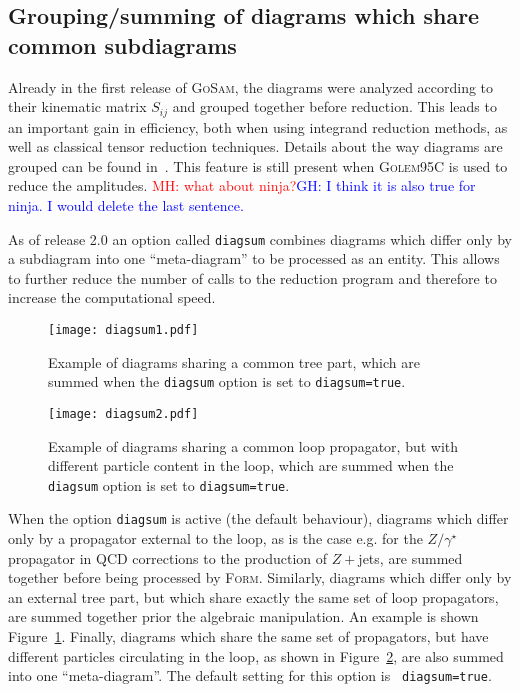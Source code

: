 \documentclass[11pt,a4paper]{refrep}
\newcommand{\gosam}{\textsc{GoSam}\xspace}
\newcommand{\golemVC}{\textsc{Golem95C}\xspace}
\newcommand{\form}{\textsc{Form}\xspace}
\begin{document}
\subsection{Grouping/summing of diagrams which share common subdiagrams}
\label{sec:grouping_summing}
Already in the first release of \gosam{}, the diagrams were analyzed
according to their kinematic matrix $S_{ij}$ and grouped together
before reduction. This leads to an important gain in efficiency, both
when using integrand reduction methods, as well as 
classical tensor reduction techniques. Details about the way diagrams
are grouped can be found in~\cite{Cullen:2011ac}.
This feature is still present when \golemVC{} is used to reduce the
amplitudes. \textcolor{red}{MH: what about ninja?}\textcolor{blue}{GH: I think it is also true for ninja. I would delete the last sentence.}

As of release 2.0 an option called {\tt diagsum} combines diagrams
which differ only by a subdiagram into one ``meta-diagram'' to be
processed as an entity. This allows to further reduce the number of
calls to the reduction program and therefore to increase the
computational speed. 

\begin{figure}[htb]
\centering
\texttt{[image: diagsum1.pdf]}
\caption{Example of diagrams sharing a common tree part, which are 
summed when the {\tt diagsum} option is set to {\tt diagsum=true}.}
\label{fig:diagsum_tree}
\end{figure} 

\begin{figure}[htb]
\centering
\texttt{[image: diagsum2.pdf]}
\caption{Example of diagrams sharing a common loop propagator, 
but with different particle content in the loop, which are summed when
the {\tt diagsum} option is set to {\tt diagsum=true}.}
\label{fig:diagsum_particle}
\end{figure} 


When the option {\tt diagsum} is active (the default behaviour), diagrams which differ only by
a propagator external to the loop, as is the case e.g. for the
$Z/\gamma^\star$ propagator in QCD corrections to the production of
$Z+$jets, are summed together before being processed
by \form{}. Similarly, diagrams which differ only by an external tree
part, but which share exactly the same set of loop propagators, are
summed together prior the algebraic manipulation. An example is shown
Figure~\ref{fig:diagsum_tree}. Finally, diagrams which share the same
set of propagators, but have different particles circulating in the
loop, as shown in Figure~\ref{fig:diagsum_particle}, are also summed
into one ``meta-diagram''. The default setting for this option is {\tt
diagsum=true}.
\end{document}
